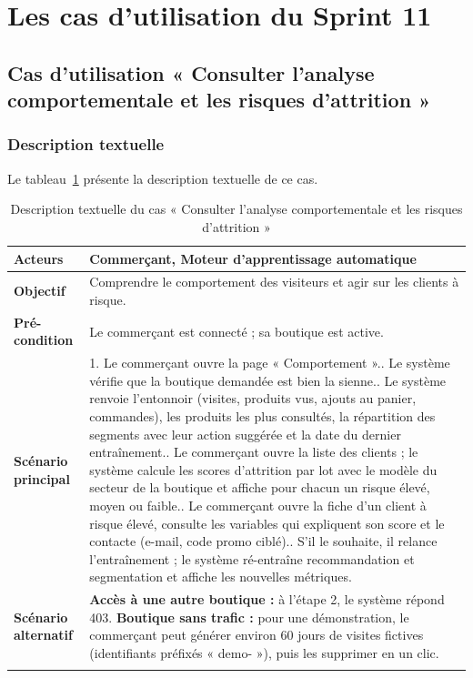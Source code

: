 \section{Les cas d'utilisation du Sprint 11}
\subsection{Cas d'utilisation « Consulter l'analyse comportementale et les risques d'attrition »}
\subsubsection{Description textuelle}
Le tableau~\ref{tab:uc-comportement} présente la description textuelle de ce cas.
\renewcommand{\arraystretch}{1.5}
\begin{longtable}{|p{4cm}|p{11cm}|}
\hline
\textbf{Acteurs} & Commerçant, Moteur d'apprentissage automatique \\
\hline
\textbf{Objectif} & Comprendre le comportement des visiteurs et agir sur les clients à risque. \\
\hline
\textbf{Pré-condition} & Le commerçant est connecté ; sa boutique est active. \\
\hline
\textbf{Scénario principal} &
1. Le commerçant ouvre la page « Comportement ».\newline
2. Le système vérifie que la boutique demandée est bien la sienne.\newline
3. Le système renvoie l'entonnoir (visites, produits vus, ajouts au panier, commandes), les produits les plus consultés, la répartition des segments avec leur action suggérée et la date du dernier entraînement.\newline
4. Le commerçant ouvre la liste des clients ; le système calcule les scores d'attrition par lot avec le modèle du secteur de la boutique et affiche pour chacun un risque élevé, moyen ou faible.\newline
5. Le commerçant ouvre la fiche d'un client à risque élevé, consulte les variables qui expliquent son score et le contacte (e-mail, code promo ciblé).\newline
6. S'il le souhaite, il relance l'entraînement ; le système ré-entraîne recommandation et segmentation et affiche les nouvelles métriques. \\
\hline
\textbf{Scénario alternatif} &
\textbf{Accès à une autre boutique :} à l'étape 2, le système répond 403.\newline
\textbf{Boutique sans trafic :} pour une démonstration, le commerçant peut générer environ 60 jours de visites fictives (identifiants préfixés « demo- »), puis les supprimer en un clic. \\
\hline
\caption{Description textuelle du cas « Consulter l'analyse comportementale et les risques d'attrition »}
\label{tab:uc-comportement}
\end{longtable}
\clearpage
